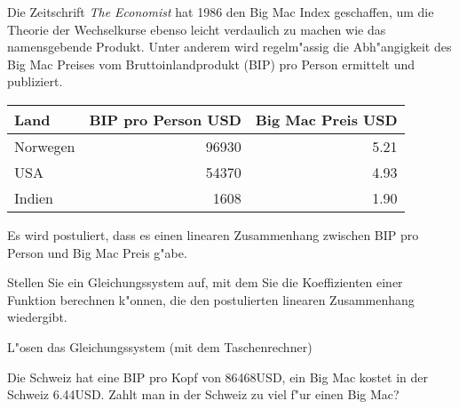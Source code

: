 Die Zeitschrift {\em The Economist} hat 1986 den Big Mac Index geschaffen,
um die Theorie der Wechselkurse ebenso leicht verdaulich zu machen wie
das namensgebende Produkt.
Unter anderem wird regelm"assig die Abh"angigkeit des Big Mac Preises
vom Bruttoinlandprodukt (BIP) pro Person ermittelt und publiziert.
\begin{center}
\begin{tabular}{|l|r|r|}
\hline
Land&BIP pro Person USD&Big Mac Preis USD\\
\hline
Norwegen&96930&5.21\\
USA&54370&4.93\\
Indien&1608&1.90\\
\hline
\end{tabular}
\end{center}
Es wird postuliert, dass es einen linearen Zusammenhang zwischen 
BIP pro Person und Big Mac Preis g"abe.

\begin{teilaufgaben}
\item Stellen Sie ein Gleichungssystem auf, mit dem Sie die Koeffizienten
einer Funktion berechnen k"onnen, die den postulierten linearen Zusammenhang
wiedergibt.
\item L"osen das Gleichungssystem (mit dem Taschenrechner)
\item Die Schweiz hat eine BIP pro Kopf von 86468USD, ein Big Mac kostet
in der Schweiz 6.44USD.
Zahlt man in der Schweiz zu viel f"ur einen Big Mac?
\end{teilaufgaben}

